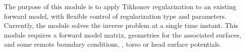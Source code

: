 
\newcommand{\x}{\times}



\ModuleRefSummary

The purpose of this module is to apply Tikhonov regularization to an
existing forward model, with flexible control of regularization type and
parameters.  Currently, the module solves the inverse problem at a single
time instant.  This module requires a forward model matrix, geometries for
the associated surfaces, and some remote boundary conditions, \ie{}, torso or
head surface potentials.


\ModuleRefUse

